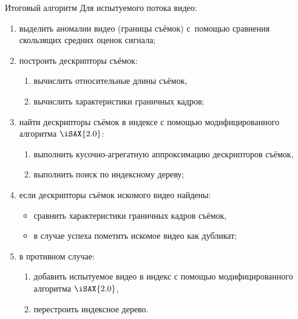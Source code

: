 \begin{frame}{Итоговый алгоритм}
    \scriptsize
    Для испытуемого потока видео:
    \begin{enumerate}
        \item выделить аномалии видео (границы съёмок) 
            с~помощью сравнения скользящих 
            средних оценок сигнала;
        \item построить дескрипторы съёмок:
        \begin{enumerate}
            \item вычислить относительные длины съёмок,
            \item вычислить характеристики граничных кадров;
        \end{enumerate}
        \item найти дескрипторы съёмок в индексе
              с помощью модифицированного алгоритма $\iSAX{2.0}$:
        \begin{enumerate}
            \item выполнить кусочно-агрегатную аппроксимацию
                  дескрипторов съёмок,
            \item выполнить поиск по индексному дереву;
        \end{enumerate}
        \item если дескрипторы съёмок искомого видео найдены:
        \begin{itemize}
            \item сравнить характеристики 
                  граничных кадров съёмок,
            \item в случае успеха 
                  пометить искомое видео как дубликат;
        \end{itemize}
        \item в противном случае: 
        \begin{enumerate}
            \item добавить испытуемое видео 
                в индекс с помощью модифицированного 
                алгоритма $\iSAX{2.0}$,
            \item перестроить индексное дерево.
        \end{enumerate}
    \end{enumerate}
\end{frame}

